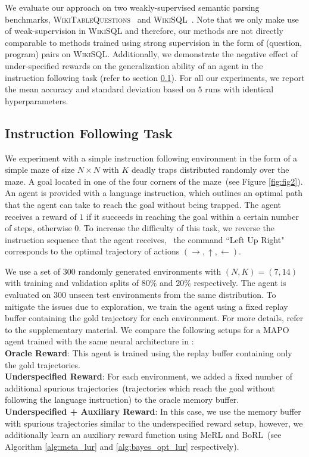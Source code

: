 We evaluate our approach on two weakly-supervised semantic parsing
benchmarks, \textsc{WikiTableQuestions}~\cite{pasupat2015tables}
and \textsc{WikiSQL}~\cite{zhong2017seq2sql}. Note that we only
make use of weak-supervision in \textsc{WikiSQL} and therefore, our methods
are not directly comparable to methods trained using strong supervision in the form
of (question, program) pairs on \textsc{WikiSQL}. Additionally, we demonstrate
the negative effect of under-specified rewards on the generalization ability
of an agent in the instruction following task (refer to section \ref{instruction_follow}). For all our experiments, we report
the mean accuracy and standard deviation based on $5$ runs with identical hyperparameters.

\subsection{Instruction Following Task}
\label{instruction_follow}

We experiment with a simple instruction following environment in the
form of a simple maze of size $N \!\times\! N$ with $K$ deadly traps
distributed randomly over the maze. A goal located in one of the four
corners of the maze~(see Figure \ref{fig:fig2}). An agent is provided
with a language instruction, which outlines an optimal path that
the agent can take to reach the goal without being trapped. The agent
receives a reward of $1$ if it succeeds in reaching the goal within a
certain number of steps, otherwise $0$. To increase the difficulty of this task, 
we reverse the instruction sequence that the agent receives, 
\ie~the command ``Left Up Right" corresponds to the optimal trajectory of actions
$(\rightarrow, \uparrow, \leftarrow)$. 

We use a set of $300$ randomly generated environments with $(N, K) = (7, 14)$ 
with training and validation splits of $80\%$ and $20\%$ respectively. 
The agent is evaluated on $300$ unseen test environments from the same distribution. 
To mitigate the issues due to exploration, we train the agent using a fixed replay
buffer containing the gold trajectory for each environment.
For more details, refer to the supplementary material. We compare
the following setups for a MAPO agent trained with the same neural
architecture in :\\[.25cm]
\triangle \textbf{Oracle Reward}: This agent is trained using the replay buffer containing only the gold trajectories.\\[.25cm]
\triangle \textbf{Underspecified Reward}: For each environment, we added a fixed number of additional spurious
trajectories~(trajectories which reach the goal without following the language instruction) to the oracle memory buffer.\\[.25cm]
\triangle \textbf{Underspecified + Auxiliary Reward}: In this case, we use the memory buffer with spurious trajectories similar
to the underspecified reward setup, however, we additionally learn an auxiliary reward function using
MeRL and BoRL~(see Algorithm \ref{alg:meta_lur} and \ref{alg:bayes_opt_lur} respectively).

